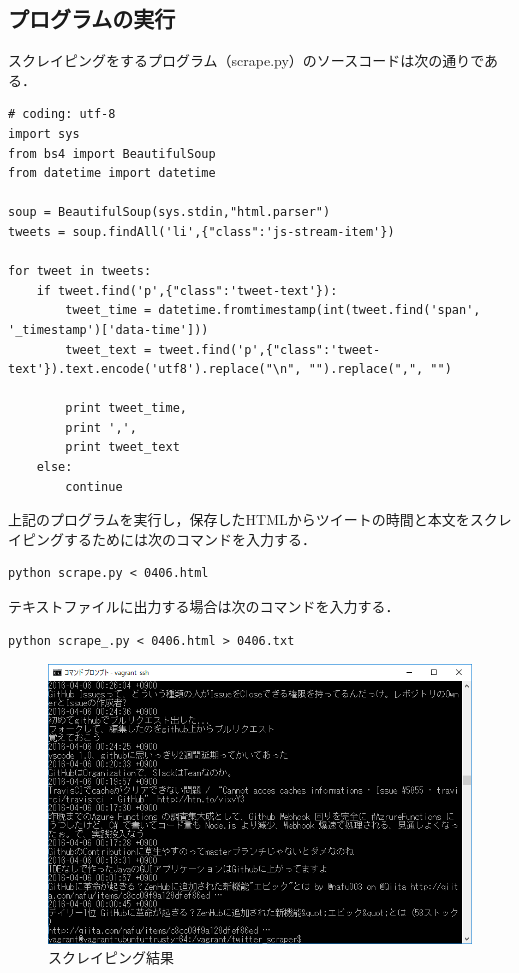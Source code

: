 \newpage
\subsection{プログラムの実行}
スクレイピングをするプログラム（scrape.py）のソースコードは次の通りである．
\begin{lstlisting}[breaklines = true, basicstyle=\ttfamily\footnotesize, frame=single]
# coding: utf-8
import sys
from bs4 import BeautifulSoup
from datetime import datetime

soup = BeautifulSoup(sys.stdin,"html.parser")
tweets = soup.findAll('li',{"class":'js-stream-item'})

for tweet in tweets:
    if tweet.find('p',{"class":'tweet-text'}):
        tweet_time = datetime.fromtimestamp(int(tweet.find('span', '_timestamp')['data-time']))
        tweet_text = tweet.find('p',{"class":'tweet-text'}).text.encode('utf8').replace("\n", "").replace(",", "")
        
        print tweet_time,
        print ',',
        print tweet_text
    else:
        continue
\end{lstlisting}

上記のプログラムを実行し，保存したHTMLからツイートの時間と本文をスクレイピングするためには次のコマンドを入力する．
\begin{lstlisting}[basicstyle=\ttfamily\footnotesize, frame=single]
python scrape.py < 0406.html
\end{lstlisting}

\newpage
テキストファイルに出力する場合は次のコマンドを入力する．
\begin{lstlisting}[basicstyle=\ttfamily\footnotesize, frame=single]
python scrape_.py < 0406.html > 0406.txt
\end{lstlisting}


\begin{figure}[htb]
\centering
\includegraphics[width=13cm]{img/scraping.png}
\caption{スクレイピング結果}
\end{figure}

